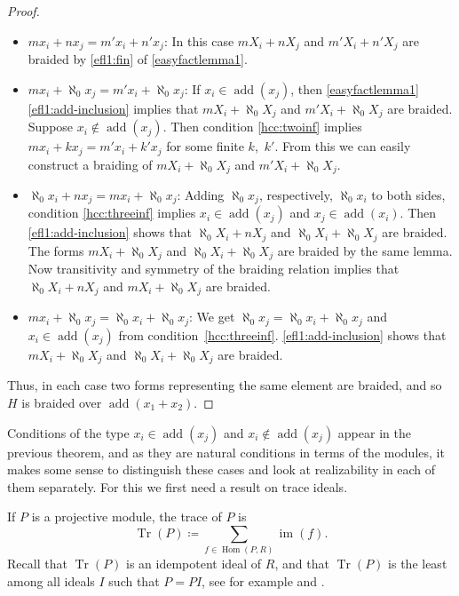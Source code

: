 \documentclass[a4paper,11pt,oneside]{amsart}
\theoremstyle{remark}
\DeclareMathOperator{\add}{add}
\DeclareMathOperator{\Hom}{Hom}
\DeclareMathOperator{\im}{im}
\newcommand{\defit}[1]{\textsf{#1}}
\DeclareMathOperator{\Tr}{Tr}
\begin{document}
\begin{proof}
  \begin{itemize}
  \item  $m x_i + n x_j = m' x_i + n' x_j$:
    In this case $m X_i + n X_j$ and $m' X_i + n' X_j$ are braided by \ref{efl1:fin} of \cref{easyfactlemma1}.
  \item $m x_i + \aleph_0 x_j = m' x_i + \aleph_0 x_j$:
    If $x_i \in \add(x_j)$, then \cref{easyfactlemma1}\ref{efl1:add-inclusion} implies that $m X_i + \aleph_0 X_j$ and $m' X_i + \aleph_0 X_j$ are braided.
    Suppose $x_i \not \in \add(x_j)$.
    Then condition \ref{hcc:twoinf} implies $m x_i + k x_j = m' x_i + k' x_j$ for some finite $k$,~$k'$.
    From this we can easily construct a braiding of $m X_i + \aleph_0 X_j$ and $m' X_i + \aleph_0 X_j$.

  \item $\aleph_0 x_i + n x_j = m x_i + \aleph_0 x_j$:
    Adding $\aleph_0 x_j$, respectively, $\aleph_0 x_i$ to both sides, condition \ref{hcc:threeinf} implies $x_i \in \add(x_j)$ and $x_j \in \add(x_i)$.
    Then \ref{efl1:add-inclusion} shows that $\aleph_0 X_i + n X_j$ and $\aleph_0 X_i + \aleph_0 X_j$ are braided.
    The forms $m X_i + \aleph_0 X_j$ and $\aleph_0 X_i + \aleph_0 X_j$ are braided by the same lemma.
    Now transitivity and symmetry of the braiding relation implies that $\aleph_0 X_i + n X_j$ and $m X_i + \aleph_0 X_j$ are braided.

  \item $m x_i + \aleph_0 x_j = \aleph_0 x_i + \aleph_0 x_j$:
    We get $\aleph_0 x_j = \aleph_0 x_i + \aleph_0 x_j$ and $x_i \in \add(x_j)$ from condition~\ref{hcc:threeinf}.
    \ref{efl1:add-inclusion} shows that $m X_i + \aleph_0 X_j$ and $\aleph_0 X_i + \aleph_0 X_j$ are braided.
  \end{itemize}
  Thus, in each case two forms representing the same element are braided, and so $H$ is braided over $\add(x_1+x_2)$.
\end{proof}

Conditions of the type $x_i \in \add(x_j)$ and $x_i \not \in \add(x_j)$ appear in the previous theorem, and as they are natural conditions in terms of the modules, it makes some sense to distinguish these cases and look at realizability in each of them separately.
For this we first need a result on trace ideals.

If $P$ is a projective module, the \defit{trace} of $P$ is
\[
  \Tr(P) \coloneqq \sum_{f \in \Hom(P,R)} \im(f).
\]
Recall that $\Tr(P)$ is an idempotent ideal of $R$, and that $\Tr(P)$ is the least among all ideals $I$ such that $P=PI$, see for example \cite{PavelandPuninski} and \cite{whitehead}.
\end{document}
